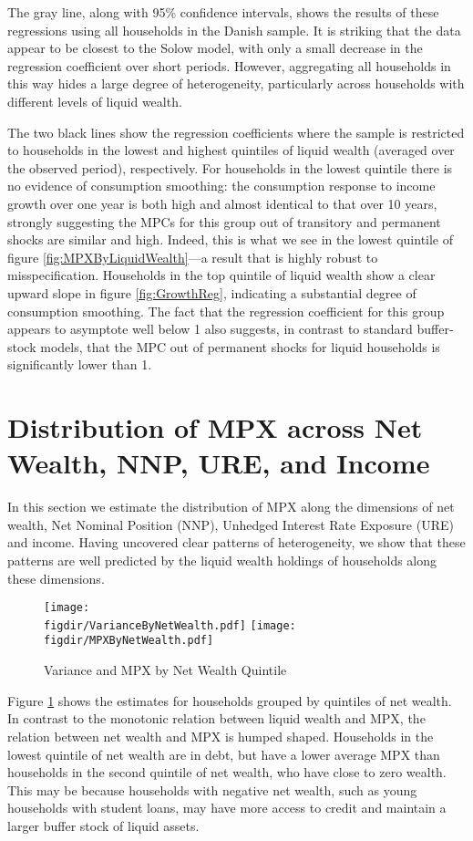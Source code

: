 \documentclass[titlepage]{\econtex}\newcommand{\texname}{ConsumptionHeterogeneity}
\newcommand{\figdir}{../Code/Rcode/Figures/AEJ_revision}
\begin{document}
	The gray line, along with 95\% confidence intervals, shows the results of these regressions using all households in the Danish sample. It is striking that the data appear to be closest to the Solow model, with only a small decrease in the regression coefficient over short periods. However, aggregating all households in this way hides a large degree of heterogeneity, particularly across households with different levels of liquid wealth.
	
	The two black lines show the regression coefficients where the sample is restricted to households in the lowest and highest quintiles of liquid wealth (averaged over the observed period), respectively. For households in the lowest quintile there is no evidence of consumption smoothing: the consumption response to income growth over one year is both high and almost identical to that over 10 years, strongly suggesting the MPCs for this group out of transitory and permanent shocks are similar and high. Indeed, this is what we see in the lowest quintile of figure \ref{fig:MPXByLiquidWealth}---a result that is highly robust to misspecification. Households in the top quintile of liquid wealth show a clear upward slope in figure \ref{fig:GrowthReg}, indicating a substantial degree of consumption smoothing. The fact that the regression coefficient for this group appears to asymptote well below 1 also suggests, in contrast to standard buffer-stock models, that the MPC out of permanent shocks for liquid households is significantly lower than 1.
	
	\section{Distribution of MPX across Net Wealth, NNP, URE, and Income}
	In this section we estimate the distribution of MPX along the dimensions of net wealth,  Net Nominal Position (NNP), Unhedged Interest Rate Exposure (URE) and income. Having uncovered clear patterns of heterogeneity, we show that these patterns are well predicted by the liquid wealth holdings of households along these dimensions.  
	
	\begin{figure}
		\centering
		\texttt{[image: \\figdir/VarianceByNetWealth.pdf]}
		\centering
		\texttt{[image: \\figdir/MPXByNetWealth.pdf]}
		\caption{Variance and MPX by Net Wealth Quintile}
		\label{fig:MPXByNetWealth}
	\end{figure}
	
	Figure \ref{fig:MPXByNetWealth} shows the estimates for households grouped by quintiles of net wealth. In contrast to the monotonic relation between liquid wealth and MPX, the relation between net wealth and MPX is humped shaped. Households in the lowest quintile of net wealth are in debt, but have a lower average MPX than households in the second quintile of net wealth, who have close to zero wealth. This may be because households with negative net wealth, such as young households with student loans, may have more access to credit and maintain a larger buffer stock of liquid assets.
	
\end{document}
